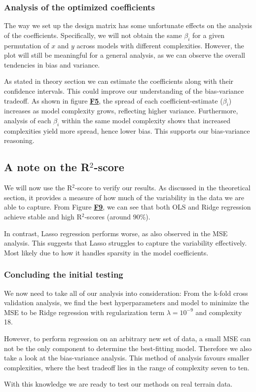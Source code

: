 \documentclass{article}
\begin{document}
\begin{multicols}{2}
\subsubsection*{Analysis of the optimized coefficients}%
The way we set up the design matrix has some unfortunate effects on the analysis of the coefficients. Specifically, we will not obtain the same $\beta_i$ for a given permutation of $x$ and $y$ across models with different complexities. However, the plot will still be meaningful for a general analysis, as we can observe the overall tendencies in bias and variance.

As stated in theory section we can estimate the coefficients along with their confidence intervals. This could improve our understanding of the bias-variance tradeoff. As shown in figure \hyperref[fig:F5]{\textbf{F5}}, the spread of each coefficient-estimate ($\beta_i$) increases as model complexity grows, reflecting higher variance. Furthermore, analysis of each $\beta_i$ within the same model complexity shows that increased complexities yield more spread, hence lower bias. This supports our bias-variance reasoning. 

\subsection*{A note on the R$^2$-score}
We will now use the R$^2$-score to verify our results. As discussed in the theoretical section, it provides a measure of how much of the variability in the data we are able to capture. From Figure \hyperref[fig:F9]{\textbf{F9}}, we can see that both OLS and Ridge regression achieve stable and high R$^2$-scores (around $90\%$).

In contrast, Lasso regression performs worse, as also observed in the MSE analysis. This suggests that Lasso struggles to capture the variability effectively. Most likely due to how it handles sparsity in the model coefficients. 

\subsubsection*{Concluding the initial testing}
We now need to take all of our analysis into consideration: From the k-fold cross validation analysis, we find the best hyperparameters and model to minimize the MSE to be Ridge regression with regularization term $\lambda=10^{-9}$ and complexity 18.

However, to perform regression on an arbitrary new set of data, a small MSE can not be the only component to determine the best-fitting model. Therefore we also take a look at the bias-variance analysis. This method of analysis favours smaller complexities, where the best tradeoff lies in the range of complexity seven to ten.

With this knowledge we are ready to test our methods on real terrain data.
\end{multicols}
\end{document}
